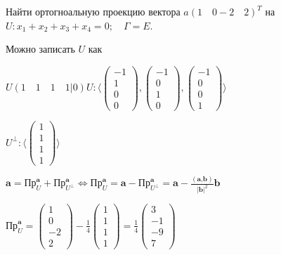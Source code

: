 \begin{prim}
Найти ортогноальную проекцию вектора $a (1\quad 0 -2 \quad2)^T$ на $U: x_1+x_2+x_3+x_4=0;\quad \Gamma =E$.

Можно записать $U$ как

$U(1\quad1\quad1\quad1|0)$\qquad $U:\langle \begin{pmatrix}
     -1 \\
      1\\
      0\\
      0
\end{pmatrix},\begin{pmatrix}
     -1 \\
      0\\
      1\\
      0
\end{pmatrix},\begin{pmatrix}
     -1 \\
      0\\
      0\\
      1
\end{pmatrix}\rangle$

$U^{\perp}:\langle\begin{pmatrix}
     1 \\
     1\\
     1\\
      1
\end{pmatrix}\rangle$
\vspace{2mm}

$\textbf{a}= \text{Пр}_U^\textbf{a}+\text{Пр}_{U^{\perp}}^\textbf{a} \Leftrightarrow \text{Пр}_U^\textbf{a} = \textbf{a} - \text{Пр}_{U^{\perp}}^\textbf{a}=\textbf{a} - \frac{(\textbf{a,b})}{|\textbf{b}|^2}\textbf{b}$

$\text{Пр}_U^\textbf{a} = \begin{pmatrix}
     1 \\
      0\\
      -2\\
      2
\end{pmatrix}-\frac{1}{4}\begin{pmatrix}
     1 \\
     1\\
     1\\
      1
\end{pmatrix}=\frac{1}{4}\begin{pmatrix}
     3 \\
     -1\\
     -9\\
      7
\end{pmatrix}$
\end{prim}
